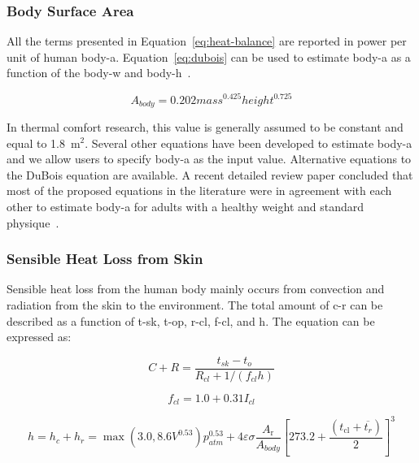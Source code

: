 \subsubsection{Body Surface Area}

All the terms presented in Equation~\ref{eq:heat-balance} are reported in power per unit of human \ac{body-a}.
Equation~\ref{eq:dubois} can be used to estimate \ac{body-a} as a function of the \ac{body-w} and \ac{body-h}~\cite{DuBois}.

\begin{equation}
    A_{body} = 0.202 mass^{0.425} height^{0.725}\label{eq:dubois}
\end{equation}

In thermal comfort research, this value is generally assumed to be constant and equal to 1.8~m$^{2}$.
Several other equations have been developed to estimate \ac{body-a} and we allow users to specify \ac{body-a} as the input value.
Alternative equations to the DuBois equation are available.
A recent detailed review paper concluded that most of the proposed equations in the literature were in agreement with each other to estimate \ac{body-a} for adults with a healthy weight and standard physique~\cite{Redlarski2016}.

\subsubsection{Sensible Heat Loss from Skin}

Sensible heat loss from the human body mainly occurs from convection and radiation from the skin to the environment.
The total amount of \ac{c-r} can be described as a function of \ac{t-sk}, \ac{t-op}, \ac{r-cl}, \ac{f-cl}, and \ac{h}.
The equation can be expressed as:

\begin{equation}
    C+R=\frac{t_{s k}-t_{o}}{R_{c l}+1 /\left(f_{c l} h\right)}\label{eq:c-r}
\end{equation}

\begin{equation}
    f_{cl}=1.0 + 0.31 I_{cl} \label{eq:f-cl}
\end{equation}

\begin{equation}
    h=h_{c} + h_{r} = \max(3.0, 8.6 V^{0.53}) p_{atm}^{0.53} + 4 \varepsilon \sigma \frac{A_{\mathrm{r}}}{A_{body}}\left[273.2+\frac{\left(t_{\mathrm{cl}}+\overline{t_{r}}\right)}{2}\right]^{3}\label{eq:h}
\end{equation}

